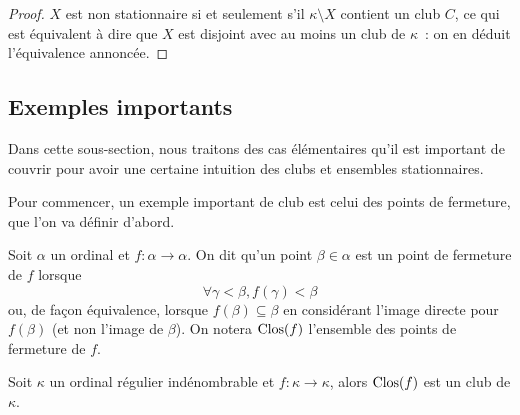 \begin{proof}
  $X$ est non stationnaire si et seulement s'il $\kappa\setminus X$ contient
  un club $C$, ce qui est équivalent à dire que $X$ est disjoint avec au moins
  un club de $\kappa$~: on en déduit l'équivalence annoncée.
\end{proof}

\subsection{Exemples importants}

Dans cette sous-section, nous traitons des cas élémentaires qu'il est important
de couvrir pour avoir une certaine intuition des clubs et ensembles
stationnaires.

Pour commencer, un exemple important de club est celui des points de fermeture,
que l'on va définir d'abord.

\begin{definition}
  Soit $\alpha$ un ordinal et $f : \alpha \to \alpha$. On dit qu'un point
  $\beta \in \alpha$ est un point de fermeture de $f$ lorsque
  \[\forall \gamma < \beta, f(\gamma) < \beta\]
  ou, de façon équivalence, lorsque $f(\beta) \subseteq \beta$ en considérant
  l'image directe pour $f(\beta)$ (et non l'image de $\beta$). On notera
  $\operatorname{Clos}(f)$ l'ensemble des points de fermeture de $f$.
\end{definition}

\begin{proposition}
  Soit $\kappa$ un ordinal régulier indénombrable et $f : \kappa \to \kappa$,
  alors $\operatorname{Clos}(f)$ est un club de $\kappa$.
\end{proposition}

